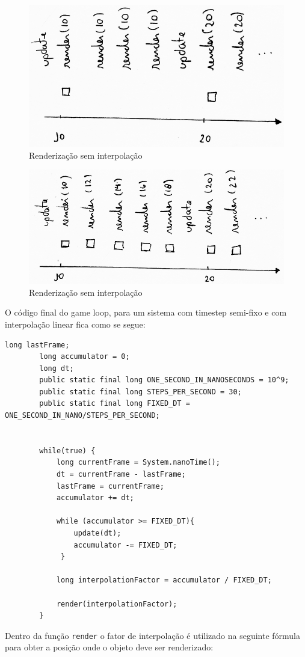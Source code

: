 \documentclass[12pt, 
openright, 
oneside, 
a4paper,    
brazil]{facom-ufu-abntex2}
\begin{document}
\begin{figure}[H]
	\centering
	\includegraphics[width=\textwidth]{imagens/ilu7_small.png}
	\caption{Renderização sem interpolação
	\label{fig:renderSemInterpolacao}}
\end{figure}
\begin{figure}[H]
	\centering
	\includegraphics[width=\textwidth]{imagens/ilu5_small.png}
	\caption{Renderização sem interpolação
	\label{fig:renderComInterpolacao}}
\end{figure}

\noindent
O código final do game loop, para um sistema com timestep semi-fixo e com interpolação linear fica como se segue:
\begin{lstlisting}[caption=Game Loop com timestep semi-fixo e interpolação linear]
		long lastFrame;
		long accumulator = 0;
		long dt;
		public static final long ONE_SECOND_IN_NANOSECONDS = 10^9;
		public static final long STEPS_PER_SECOND = 30;
		public static final long FIXED_DT = ONE_SECOND_IN_NANO/STEPS_PER_SECOND;
		
		
		while(true) {
			long currentFrame = System.nanoTime(); 
			dt = currentFrame - lastFrame;
			lastFrame = currentFrame;
			accumulator += dt;
	
			while (accumulator >= FIXED_DT){
    			update(dt);
    			accumulator -= FIXED_DT;
 			 }
 			 
			long interpolationFactor = accumulator / FIXED_DT; 			 
 			 
			render(interpolationFactor);
		}
\end{lstlisting}
Dentro da função \texttt{render} o fator de interpolação é utilizado na seguinte fórmula para obter a posição onde o objeto deve ser renderizado:
\end{document}
